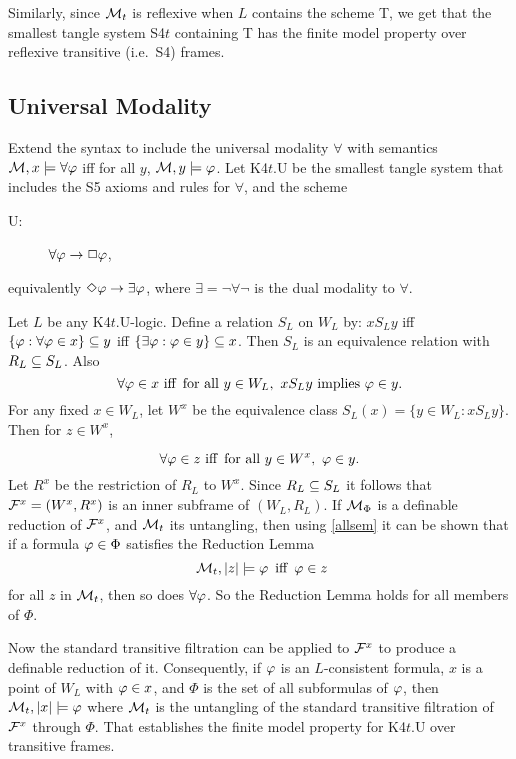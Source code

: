  Similarly, since $\mathcal{M}_t$ is reflexive when $L$ contains the scheme T, we get that the smallest tangle system S4$t$ containing T has the finite model property over reflexive transitive (i.e.\ S4) frames.
 


 \subsection{Universal Modality}
 
 Extend the syntax to include the universal modality $\forall$ with semantics $\mathcal{M},x\models\forall\varphi$ iff for all $y$, 
 $\mathcal{M},y\models\varphi$.  Let K4$t$.U be the smallest tangle system that 
  includes the S5 axioms and rules for $\forall$, and the scheme
 \begin{description}
\item[U:]
 $\forall\varphi\to\Box\varphi$,
\end{description}
equivalently $\Diamond\varphi\to\exists\varphi$, where $\exists=\neg\forall\neg$ is the dual modality to $\forall$.
 
 Let $L$ be any K4$t$.U-logic.
 Define a relation $S_L$ on $W_L$ by: $xS_Ly$ iff $\{\varphi:\forall\varphi\in x\}\subseteq y$ iff
 $\{\exists\varphi:\varphi\in y\}\subseteq x$. Then $S_L$ is an equivalence relation with $R_L\subseteq S_L$. Also
 $$
 \forall\varphi\in x \text{ iff\enspace  for all } y\in W_L, \ xS_Ly \text{ implies }\varphi\in y.
 $$
 For any fixed $x\in W_L$, let $W^x$ be the equivalence class $S_L(x)=\{y\in W_L:xS_Ly\}$. Then for $z\in W^x$,
 
\begin{equation}  \label{allsem}
 \forall\ph\in z \text{ iff\enspace  for all } y\in W^x, \ \ph\in y.
\end{equation} 
Let $R^x$ be the restriction of $R_L$ to $W^x$. Since $R_L\subseteq S_L$ it follows that $\mathcal{F}^x=(W^x,R^x)$ is an inner subframe of 
$(W_L,R_L)$.
If $\mathcal{M}_\Phi$ is a definable reduction of $\mathcal{F}^x$, and $\mathcal{M}_t$ its untangling, then using \eqref{allsem} it can be shown that if 
a formula $\varphi\in\Phi$ satisfies the Reduction Lemma
 \begin{equation*}
\text{
$\mathcal{M}_t,|z|\models \varphi$\enspace iff\enspace $\varphi\in z$}
\end{equation*}
for all $z$ in $\mathcal{M}_t$, then so does $\forall\varphi$. So the Reduction Lemma holds for all members of $\Phi$.

Now the standard transitive filtration can be applied to $\mathcal{F}^x$ to produce a definable reduction of it.
Consequently,  if $\varphi$ is an
  $L$-consistent formula,  $x$ is a point of $W_L$ with  $\varphi\in x$, and $\Phi$ is the set of all subformulas of $\varphi$, then 
  $\mathcal{M}_t,|x|\models \varphi$ where $\mathcal{M}_t$ is the untangling of the standard transitive filtration of $\mathcal{F}^x$ through $\Phi$.
That establishes the finite model property for K4$t$.U over transitive frames.

